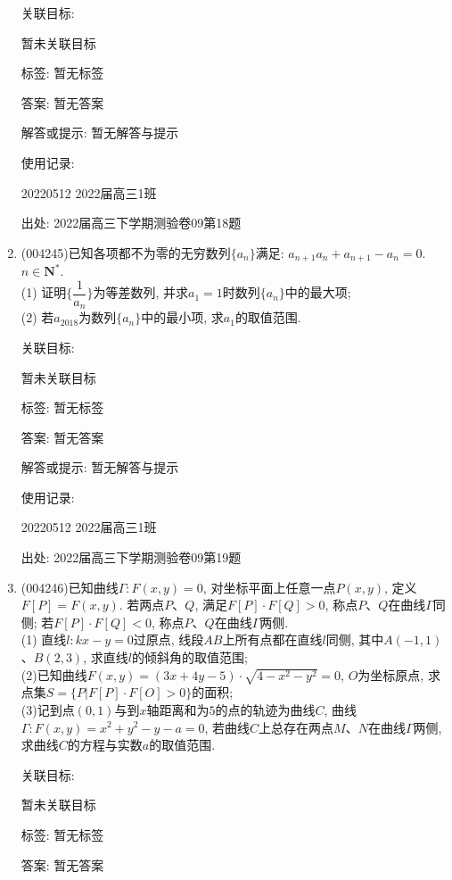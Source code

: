 \documentclass[10pt,a4paper]{article}
\begin{document}
\begin{enumerate}[1.]
关联目标:

暂未关联目标



标签: 暂无标签

答案: 暂无答案

解答或提示: 暂无解答与提示

使用记录:

20220512	2022届高三1班		


出处: 2022届高三下学期测验卷09第18题
\item { (004245)}已知各项都不为零的无穷数列$\{a_n\}$满足: ${a_{n+1}}a_n+{a_{n+1}}-a_n=0$.$n\in \mathbf{N}^*$.\\
(1) 证明$\{\dfrac 1{a_n}\}$为等差数列, 并求$a_1=1$时数列$\{a_n\}$中的最大项;\\
(2) 若$a_{2018}$为数列$\{a_n\}$中的最小项, 求$a_1$的取值范围.


关联目标:

暂未关联目标



标签: 暂无标签

答案: 暂无答案

解答或提示: 暂无解答与提示

使用记录:

20220512	2022届高三1班		


出处: 2022届高三下学期测验卷09第19题
\item { (004246)}已知曲线$\Gamma:F(x,y)=0$, 对坐标平面上任意一点$P(x,y)$, 定义$F[P]=F(x,y)$. 若两点$P$、$Q$, 满足$F[P]\cdot F[Q]>0$, 称点$P$、$Q$在曲线$\Gamma$同侧; 若$F[P]\cdot F[Q]<0$, 称点$P$、$Q$在曲线$\Gamma$两侧.\\
(1) 直线$l:kx-y=0$过原点, 线段$AB$上所有点都在直线$l$同侧, 其中$A(-1,1)$、$B(2,3)$, 求直线$l$的倾斜角的取值范围;\\
(2)已知曲线$F(x,y)=(3x+4y-5)\cdot \sqrt{4-x^2-y^2}=0$, $O$为坐标原点, 求点集$S=\{P|F[P]\cdot F[O]>0\}$的面积;\\
(3)记到点$(0,1)$与到$x$轴距离和为$5$的点的轨迹为曲线$C$, 曲线$\Gamma :F(x,y)=x^2+y^2-y-a=0$, 若曲线$C$上总存在两点$M$、$N$在曲线$\Gamma$两侧, 求曲线$C$的方程与实数$a$的取值范围.


关联目标:

暂未关联目标



标签: 暂无标签

答案: 暂无答案


\end{enumerate}
\end{document}
